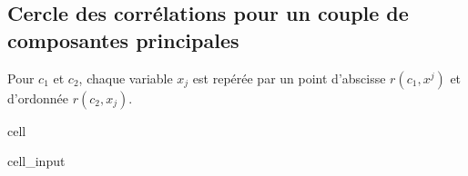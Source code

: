 \documentclass[letterpaper,10pt,french]{sphinxmanual}
\begin{document}
\subsection{Cercle des corrélations pour un couple de composantes principales}
\label{\detokenize{acp:cercle-des-correlations-pour-un-couple-de-composantes-principales}}
\sphinxAtStartPar
Pour \(c_1\) et \(c_2\), chaque variable \(x_j\) est repérée par un point d’abscisse \(r(c_1,x^j)\) et d’ordonnée \(r(c_2, x_j)\).

\begin{sphinxuseclass}{cell}
\begin{sphinxuseclass}{cell_input}
\begin{sphinxVerbatim}[commandchars=\\\{\}]
  \PYG{p}{[}\PYG{p}{]}  
  \PYG{p}{[}\PYG{p}{]}  
  \PYG{p}{[}\PYG{p}{]}  
    
    
    



\end{sphinxVerbatim}
\end{sphinxuseclass}
\end{sphinxuseclass}
\end{document}
